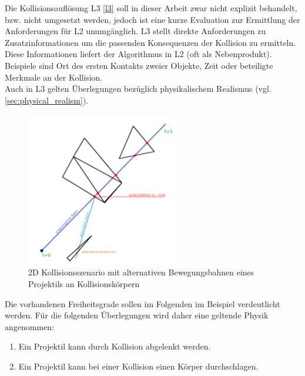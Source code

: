 Die Kollisionsauflösung L3 \ref{l3} soll in dieser Arbeit zwar nicht explizit behandelt, bzw. nicht umgesetzt werden, jedoch ist eine kurze Evaluation zur Ermittlung der Anforderungen für L2 unumgänglich.
L3 stellt direkte Anforderungen zu Zusatzinformationen um die passenden Konsequenzen der Kollision zu ermitteln. Diese Informationen liefert der Algorithmus in L2 (oft als Nebenprodukt). Beispiele sind Ort des ersten Kontakts zweier Objekte, Zeit oder beteiligte Merkmale an der Kollision.\\

Auch in L3 gelten Überlegungen bezüglich physikalischem Realismus (vgl. \ref{sec:physical_realism}).


\begin{figure}
	\centering
	\includegraphics[width=0.6\textwidth]{./res/l3_col.png}
	\caption{2D Kollisionsszenario mit alternativen Bewegungsbahnen eines Projektils an Kollisionskörpern}
	\label{fig:l3col}
\end{figure}

Die vorhandenen Freiheitsgrade sollen im Folgenden im Beispiel verdeutlicht werden. Für die folgenden Überlegungen wird daher eine geltende Physik angenommen:
\begin{enumerate}
	\item Ein Projektil kann durch Kollision abgelenkt werden.
	\item Ein Projektil kann bei einer Kollision einen Körper durchschlagen.
\end{enumerate}

